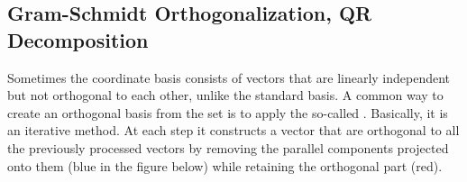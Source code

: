 \subsection{Gram-Schmidt Orthogonalization, QR Decomposition}
\label{section:GSortho}
Sometimes the coordinate basis consists of vectors that are linearly independent but not orthogonal to each other, unlike the standard basis. A common way to create an orthogonal basis from the set is to apply the so-called . Basically, it is an iterative method. At each step it constructs a vector that are orthogonal to all the previously processed vectors by removing the parallel components projected onto them (blue in the figure below) while retaining the orthogonal part (red).
\begin{center}
\end{center}
